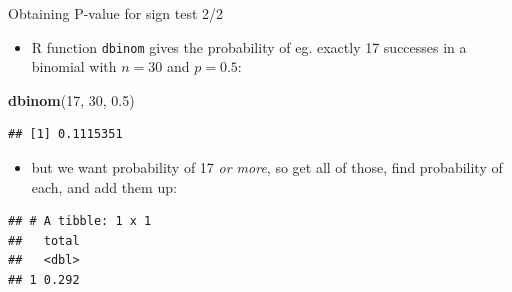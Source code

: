 \documentclass[
  ignorenonframetext,
]{beamer}
\newenvironment{Shaded}{\begin{snugshade}}{\end{snugshade}}
\newcommand{\DataTypeTok}[1]{\textcolor[rgb]{0.13,0.29,0.53}{#1}}
\newcommand{\DecValTok}[1]{\textcolor[rgb]{0.00,0.00,0.81}{#1}}
\newcommand{\FloatTok}[1]{\textcolor[rgb]{0.00,0.00,0.81}{#1}}
\newcommand{\KeywordTok}[1]{\textcolor[rgb]{0.13,0.29,0.53}{\textbf{#1}}}
\newcommand{\NormalTok}[1]{#1}
\newcommand{\OperatorTok}[1]{\textcolor[rgb]{0.81,0.36,0.00}{\textbf{#1}}}
\newcommand{\StringTok}[1]{\textcolor[rgb]{0.31,0.60,0.02}{#1}}
\providecommand{\tightlist}{%
  \setlength{\itemsep}{0pt}\setlength{\parskip}{0pt}}
\begin{document}
\begin{frame}[fragile]{Obtaining P-value for sign test 2/2}
\protect\hypertarget{obtaining-p-value-for-sign-test-22}{}

\begin{itemize}
\tightlist
\item
  R function \texttt{dbinom} gives the probability of eg. exactly 17
  successes in a binomial with \(n = 30\) and \(p = 0.5\):
\end{itemize}

\begin{Shaded}
\begin{Highlighting}[]
\KeywordTok{dbinom}\NormalTok{(}\DecValTok{17}\NormalTok{, }\DecValTok{30}\NormalTok{, }\FloatTok{0.5}\NormalTok{)}
\end{Highlighting}
\end{Shaded}

\begin{verbatim}
## [1] 0.1115351
\end{verbatim}

\begin{itemize}
\tightlist
\item
  but we want probability of 17 \emph{or more}, so get all of those,
  find probability of each, and add them up:
\end{itemize}

\begin{Shaded}
\end{Shaded}

\begin{verbatim}
## # A tibble: 1 x 1
##   total
##   <dbl>
## 1 0.292
\end{verbatim}

\end{frame}
\end{document}
